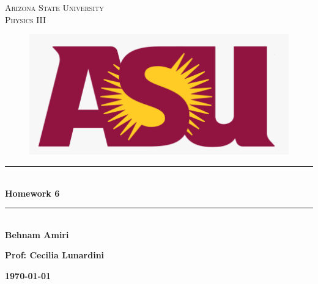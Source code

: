 \documentclass[fleqn]{article}
\begin{document}
  \begin{titlepage}

    \newcommand{\HRule}{\rule{\linewidth}{0.5mm}} %

    \center %
    


    \textsc{\LARGE Arizona State University}\\[1.5cm] %

    \textsc{\LARGE Physics III }\\[1.5cm] %


    \begin{figure}
      \includegraphics[width=\linewidth]{asu.png}
    \end{figure}


    \HRule \\[0.4cm]
    { \huge \bfseries Homework 6}\\[0.4cm] 
    \HRule \\[1.5cm]
    
    \textbf{Behnam Amiri}

    \bigbreak

    \textbf{Prof: Cecilia Lunardini}

    \bigbreak


    \textbf{{\large \today}\\[2cm]}

    \vfill %

  \end{titlepage}
\end{document}
